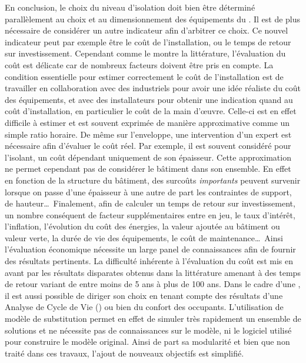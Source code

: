En conclusion, le choix du niveau d’isolation doit bien être déterminé parallèlement au choix
et au dimensionnement des
équipements du . Il est de plus nécessaire de considérer un autre indicateur afin
d’arbitrer ce choix. Ce nouvel indicateur peut par exemple être le coût de l’installation,
ou le temps de retour sur investissement. Cependant comme le montre la littérature,
l’évaluation du coût est délicate car de nombreux facteurs doivent être pris en compte. La
condition essentielle pour estimer correctement le coût de l’installation est de
travailler en collaboration avec des industriels pour avoir une idée réaliste du coût des
équipements, et avec des installateurs pour obtenir une indication quand au coût
d’installation, en particulier le coût de la main d’œuvre. Celle-ci est en effet difficile
à estimer et est souvent exprimée de manière approximative comme un simple ratio horaire.
De même sur l’enveloppe, une intervention d’un expert est nécessaire afin d’évaluer le
coût réel. Par exemple, il est souvent considéré pour l’isolant, un coût dépendant
uniquement de son épaisseur. Cette approximation ne permet cependant pas de considérer le
bâtiment dans son ensemble. En effet en fonction de la structure du bâtiment, des surcoûts
\emph{importants} peuvent survenir lorsque on passe d’une épaisseur à une autre de part
les contraintes de support, de hauteur\dots\ Finalement, afin de calculer un
temps de retour sur investissement, un nombre conséquent de facteur supplémentaires entre en jeu, le
taux d’intérêt, l’inflation, l’évolution du coût des énergies, la valeur ajoutée au
bâtiment ou valeur verte, la durée de vie des équipements, le coût de maintenance\dots\
Ainsi l’évaluation économique nécessite un large panel de connaissances
afin de fournir des résultats pertinents.
La difficulté inhérente à l’évaluation du coût est mis en avant par les résultats
disparates obtenus dans la littérature amenant à des temps de retour variant de entre moins de
\num{5} ans à plus de \num{100} ans.
Dans le cadre d’une , il est aussi possible de diriger son choix en tenant
compte des résultats d’une Analyse de Cycle de Vie (\abr{ACV}) ou bien du confort des occupants.
L’utilisation de modèle de substitution permet en effet de simuler très rapidement
un ensemble de solutions et ne nécessite pas de connaissances sur le modèle, ni le
logiciel utilisé pour construire le modèle original. Ainsi de part sa modularité
et bien que non traité dans ces travaux, l’ajout de nouveaux objectifs est simplifié.

